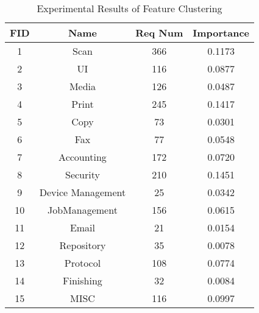 \documentclass[sigconf]{acmart}
\begin{document}
\begin{table}[]
    \centering
    \begin{tabular}{|c|c|c|c|}
    \hline
FID & Name & Req Num & Importance \\ \hline
1 & Scan & 366 & 0.1173\\ \hline
2 & UI & 116 & 0.0877  \\ \hline
3 & Media & 126 & 0.0487 \\ \hline
4 & Print & 245 & 0.1417 \\ \hline
5 & Copy & 73 & 0.0301  \\ \hline
6 & Fax & 77 & 0.0548 \\ \hline   
7 & Accounting & 172 &0.0720  \\ \hline
8 & Security & 210 & 0.1451  \\ \hline
9 & Device Management & 25 & 0.0342 \\ \hline
10 & JobManagement & 156 & 0.0615 \\ \hline
11 & Email & 21 & 0.0154\\ \hline
12 & Repository & 35 & 0.0078 \\ \hline 
13 & Protocol & 108 & 0.0774 \\ \hline
14 & Finishing & 32 & 0.0084 \\ \hline
15 & MISC & 116 & 0.0997 \\ \hline
    \end{tabular}
    \caption{Experimental Results of Feature Clustering}
    \label{tab:3}
\end{table}
\end{document}
